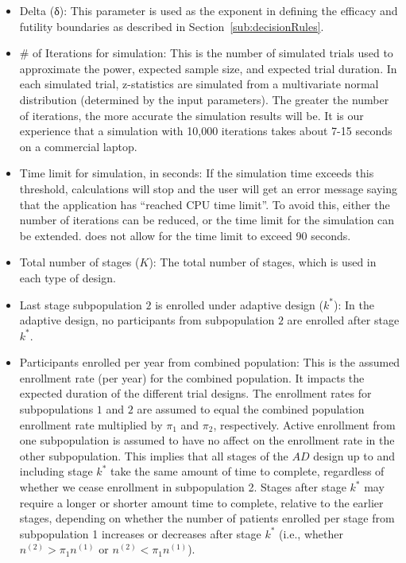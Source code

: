 \documentclass[article]{jss}
\begin{document}
\begin{itemize}

\item Delta (δ): This parameter is used as the exponent in defining the efficacy and futility boundaries as described in Section~\ref{sub:decisionRules}. %

\item \# of Iterations for simulation: This is the number of simulated trials used to 
 approximate the power, expected sample size, and expected trial duration. In each simulated trial,
 z-statistics are simulated from a multivariate normal distribution (determined by the input parameters).
The greater the number of iterations, the more accurate the simulation results will be.
It is our experience that a simulation with 10,000 iterations takes about 7-15 seconds on a commercial laptop.

\item Time limit for simulation, in seconds: If the simulation time exceeds this threshold, calculations will stop and the user will get an error message saying that the application has ``reached CPU time limit''. To avoid this, either the number of iterations can be reduced, or the time limit for the simulation can be extended.  does not allow for the time limit to exceed 90 seconds.

\item Total number of stages ($K$): The total number of stages, which is used in each type of design. 

\item Last stage subpopulation $2$ is enrolled under adaptive design ($k^*$): In the adaptive design, no participants from subpopulation $2$ are enrolled after stage $k^*$. 

\item Participants enrolled per year from combined population: This is the assumed enrollment rate (per year) for the combined population. It impacts the expected duration of the different trial designs. The enrollment rates for  subpopulations $1$ and $2$ are assumed to equal the combined population enrollment rate multiplied by $π_1$ and $π_2$, respectively. Active enrollment from one subpopulation is assumed to have no affect on the enrollment rate in the other subpopulation. This implies that all stages of the $AD$ design up to and including stage $k^*$ take the same amount of time to complete, regardless of whether we cease enrollment in subpopulation 2. Stages after stage $k^*$ may require a longer or shorter amount time to complete, relative to the earlier stages, depending on whether the number of patients enrolled per stage from subpopulation 1 increases or decreases after stage $k^*$ (i.e., whether $n^{(2)}>\pi_1 n^{(1)}$ or $n^{(2)}<\pi_1 n^{(1)}$).


\end{itemize}
\end{document}
